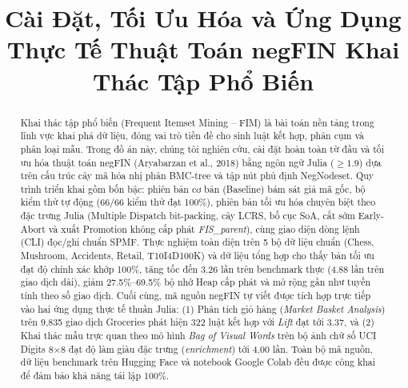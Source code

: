 \documentclass[conference]{IEEEtran}
\begin{document}
\title{Cài Đặt, Tối Ưu Hóa và Ứng Dụng Thực Tế Thuật Toán negFIN Khai Thác Tập Phổ Biến}

\author{
\and
{}
}

\maketitle

\begin{abstract}
\mdseries
Khai thác tập phổ biến (Frequent Itemset Mining -- FIM) là bài toán nền tảng trong lĩnh vực khai phá dữ liệu, đóng vai trò tiền đề cho sinh luật kết hợp, phân cụm và phân loại mẫu. Trong đồ án này, chúng tôi nghiên cứu, cài đặt hoàn toàn từ đầu và tối ưu hóa thuật toán negFIN (Aryabarzan et al., 2018) bằng ngôn ngữ Julia ($\ge 1.9$) dựa trên cấu trúc cây mã hóa nhị phân BMC-tree và tập nút phủ định NegNodeset. Quy trình triển khai gồm bốn bậc: phiên bản cơ bản (Baseline) bám sát giả mã gốc, bộ kiểm thử tự động (66/66 kiểm thử đạt 100\%), phiên bản tối ưu hóa chuyên biệt theo đặc trưng Julia (Multiple Dispatch bit-packing, cây LCRS, bố cục SoA, cắt sớm Early-Abort và xuất Promotion không cấp phát \textit{FIS\_parent}), cùng giao diện dòng lệnh (CLI) đọc/ghi chuẩn SPMF. Thực nghiệm toàn diện trên 5 bộ dữ liệu chuẩn (Chess, Mushroom, Accidents, Retail, T10I4D100K) và dữ liệu tổng hợp cho thấy bản tối ưu đạt độ chính xác khớp 100\%, tăng tốc đến 3.26 lần trên benchmark thực (4.88 lần trên giao dịch dài), giảm 27.5\%--69.5\% bộ nhớ Heap cấp phát và mở rộng gần như tuyến tính theo số giao dịch. Cuối cùng, mã nguồn negFIN tự viết được tích hợp trực tiếp vào hai ứng dụng thực tế thuần Julia: (1) Phân tích giỏ hàng (\textit{Market Basket Analysis}) trên 9,835 giao dịch Groceries phát hiện 322 luật kết hợp với \textit{Lift} đạt tới 3.37, và (2) Khai thác mẫu trực quan theo mô hình \textit{Bag of Visual Words} trên bộ ảnh chữ số UCI Digits 8$\times$8 đạt độ làm giàu đặc trưng (\textit{enrichment}) tới 4.00 lần. Toàn bộ mã nguồn, dữ liệu benchmark trên Hugging Face và notebook Google Colab đều được công khai để đảm bảo khả năng tái lập 100\%.
\end{abstract}
\end{document}
